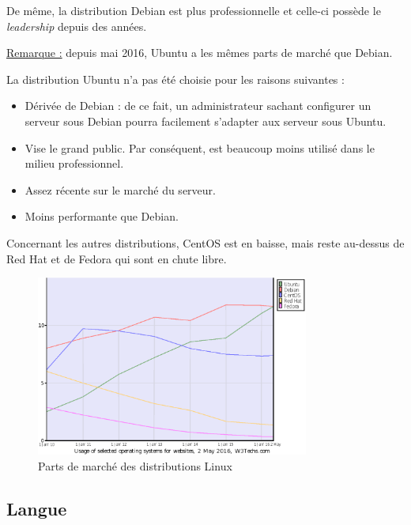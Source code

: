 \newpage

De même, la distribution Debian est plus professionnelle et celle-ci possède le
\textit{leadership} depuis des années.

\underline{Remarque :} depuis mai 2016, Ubuntu a les mêmes parts de marché que
Debian.

La distribution Ubuntu n'a pas été choisie pour les raisons suivantes :
\begin{itemize}
\item Dérivée de Debian : de ce fait, un administrateur sachant configurer un
serveur sous Debian pourra facilement s'adapter aux serveur sous Ubuntu.

\item Vise le grand public. Par conséquent, est beaucoup moins utilisé dans le
milieu professionnel.

\item Assez récente sur le marché du serveur.

\item Moins performante que Debian.
\end{itemize}

Concernant les autres distributions, CentOS est en baisse, mais reste au-dessus
de Red Hat et de Fedora qui sont en chute libre.

\begin{figure}[h]
  \centering
  \includegraphics[width=0.8\textwidth]
  {textures/images/installation/distributions.eps}
  \caption{Parts de marché des distributions Linux}
\end{figure}

\newpage

\subsection{Langue}
\label{subsec:langue}

